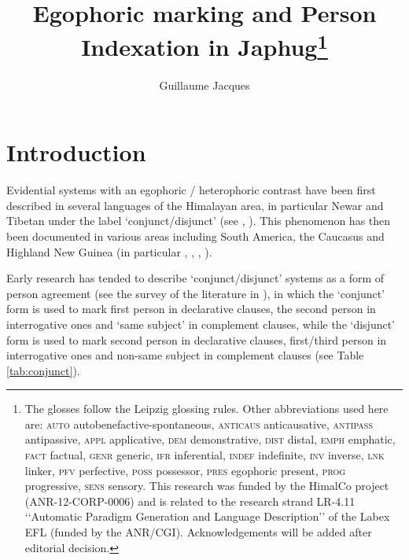 \documentclass[oldfontcommands,oneside,a4paper,11pt]{article}
\begin{document}
 
\title{Egophoric marking and Person Indexation in Japhug\footnote{ The glosses follow the Leipzig glossing rules. Other abbreviations used here are: \textsc{auto}  autobenefactive-spontaneous, \textsc{anticaus} anticausative, \textsc{antipass} antipassive, \textsc{appl} applicative, \textsc{dem} demonstrative,  \textsc{dist} distal, \textsc{emph} emphatic, \textsc{fact} factual, \textsc{genr} generic, \textsc{ifr} inferential, \textsc{indef} indefinite, \textsc{inv} inverse,  \textsc{lnk} linker, \textsc{pfv} perfective, \textsc{poss} possessor, \textsc{pres} egophoric present, \textsc{prog} progressive, \textsc{sens} sensory. This research was funded by the HimalCo project (ANR-12-CORP-0006) and is related to the research strand LR-4.11 ‘‘Automatic Paradigm Generation and Language Description’’ of the Labex EFL (funded by the ANR/CGI). Acknowledgements   will be added after editorial decision. %
} }
\author{Guillaume Jacques}
\maketitle


\sloppy
\section*{Introduction}
Evidential systems with an egophoric / heterophoric contrast have been first described in several languages of the Himalayan area, in particular Newar and Tibetan under the label `conjunct/disjunct' (see \citealt{hale80conjunct}, \citealt{delancey92conjunct}). This phenomenon has then been documented in various areas including South America, the Caucasus and Highland New Guinea (in particular \citealt{creissels08akhvakh}, \citealt{curnow02conjunct}, \citealt{sanroque12evidentiality}, \citealt{sanroque17interrogativity}). 

Early research has tended to describe `conjunct/disjunct' systems as a form of person agreement (see the survey of the literature in \citealt{hill17evidential}), in which the `conjunct' form is used to mark first person in declarative clauses, the second person in interrogative ones and `same subject' in complement clauses, while the `disjunct' form is used to mark second person in declarative clauses, first/third person in interrogative ones and non-same subject in complement clauses (see Table \ref{tab:conjunct}).
\end{document}

